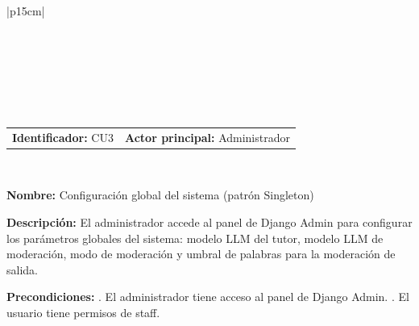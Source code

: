 \begingroup
{} %
\setlength{\arrayrulewidth}{1pt}
\begin{longtable}{|p{15cm}|}
  
  \hline
   \\
  \hline
  \endfirsthead
  
   \\
  \hline
   \\
  \hline
  \endhead
  
  \hline {} \\ \hline
  \endfoot
  
  \hline
  \caption{Caso de Uso CU3 — Configuración Global (Singleton) por el Administrador.}
  \label{TB:CU3_SINGLETON}
  \endlastfoot

  \begin{tabularx}{\linewidth}{@{}X X@{}}
    \textbf{Identificador:} CU3 & \textbf{Actor principal:} Administrador
  \end{tabularx} \\ \hline

  \textbf{Nombre:} Configuración global del sistema (patrón Singleton) \\ \hline

  \textbf{Descripción:} \newline 
  El administrador accede al panel de Django Admin para configurar los parámetros globales del sistema: modelo LLM del tutor, modelo LLM de moderación, modo de moderación y umbral de palabras para la moderación de salida. \\ \hline

  \textbf{Precondiciones:} . El administrador tiene acceso al panel de Django Admin. . El usuario tiene permisos de staff. \\ \hline


\end{longtable}
